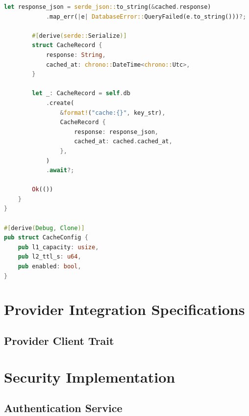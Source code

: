 \documentclass[12pt,a4paper,twoside]{report}
\begin{document}
\begin{lstlisting}[language=Rust,caption={Cache Manager - crates/gaussmeridian-cache/src/lib.rs}]
        let response_json = serde_json::to_string(&cached.response)
            .map_err(|e| DatabaseError::QueryFailed(e.to_string()))?;
        
        #[derive(serde::Serialize)]
        struct CacheRecord {
            response: String,
            cached_at: chrono::DateTime<chrono::Utc>,
        }
        
        let _: CacheRecord = self.db
            .create(
                &format!("cache:{}", key_str),
                CacheRecord {
                    response: response_json,
                    cached_at: cached.cached_at,
                },
            )
            .await?;
        
        Ok(())
    }
}

#[derive(Debug, Clone)]
pub struct CacheConfig {
    pub l1_capacity: usize,
    pub l2_ttl_s: u64,
    pub enabled: bool,
}
\end{lstlisting}



\chapter{Provider Integration Specifications}

\section{Provider Client Trait}



\chapter{Security Implementation}

\section{Authentication Service}
\end{document}
